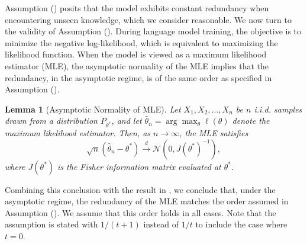 \documentclass[11pt]{article}
\theoremstyle{plain}
\newtheorem{lemma}[theorem]{Lemma}
\theoremstyle{definition}
\newcommand{\zhixuan}[1]{{\it \color{blue}{zhixuan: #1}}}
\begin{document}
Assumption (\uppercase\expandafter{}) posits that the model exhibits constant redundancy when encountering unseen knowledge, which we consider reasonable. We now turn to the validity of Assumption (\uppercase\expandafter{}). 
During language model training, the objective is to minimize the negative log-likelihood, which is equivalent to maximizing the likelihood function. When the model is viewed as a maximum likelihood estimator (MLE), the asymptotic normality of the MLE implies that the redundancy, in the asymptotic regime, is of the same order as specified in Assumption (\uppercase\expandafter{}). 
\begin{lemma}[Asymptotic Normality of MLE]
Let \( X_1, X_2, \dots, X_n \) be $n$ i.i.d. samples drawn from a distribution \( P_{\theta^*} \), and let \( \hat{\theta}_n = \arg \max_{\theta} \ell(\theta) \) denote the maximum likelihood estimator. Then, as \( n \to \infty \), the MLE satisfies
\[
\sqrt{n}(\hat{\theta}_n - \theta^*) \xrightarrow{d} \mathcal{N}(0, J(\theta^*)^{-1}),
\]
where \( J(\theta^*) \) is the Fisher information matrix evaluated at \( \theta^* \). 
\end{lemma}
Combining this conclusion with the result in , we conclude that, under the asymptotic regime, the redundancy of the MLE matches the order assumed in Assumption (\uppercase\expandafter{}). We assume that this order holds in all cases. Note that the assumption is stated with $1/(t+1)$ instead of $1/t$ to include the case where $t = 0$.






\end{document}
